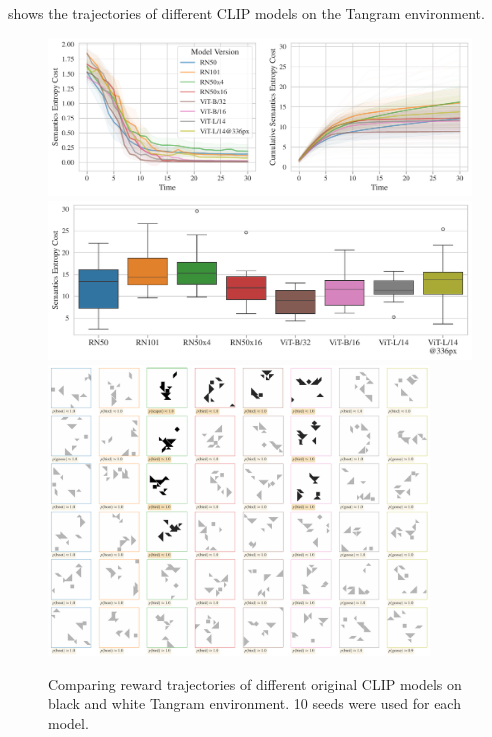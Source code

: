 
 shows the trajectories of different CLIP models on the Tangram environment.
\begin{figure}[H]
    \centering
    \includegraphics[width=\textwidth]{images/model_comparison.pdf}
    \includegraphics[width=\textwidth]{images/model_comparison_boxplot.pdf}
    \includegraphics[width=0.9\textwidth]{images/model_samples.pdf}
    \caption{Comparing reward trajectories of different original CLIP models on black and white Tangram environment. 10 seeds were used for each model.}
    \label{fig:clip-traj-comparison}
\end{figure}

